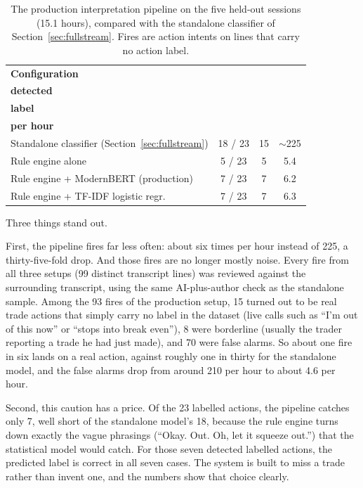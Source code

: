 \begin{table}[H]
\centering
\caption{The production interpretation pipeline on the five held-out sessions (15.1 hours), compared with the standalone classifier of Section~\ref{sec:fullstream}. Fires are action intents on lines that carry no action label.}
\label{tab:pipeline_fullstream}
\footnotesize
\setlength{\tabcolsep}{4pt}
\begin{tabular}{@{}lccc@{}}
\toprule
\textbf{Configuration} & \shortstack{\textbf{Labelled actions}\\\textbf{detected}} & \shortstack{\textbf{Exact}\\\textbf{label}} & \shortstack{\textbf{Fires}\\\textbf{per hour}} \\
\midrule
Standalone classifier (Section~\ref{sec:fullstream}) & 18 / 23 & 15 & $\sim$225 \\
Rule engine alone                                    &  5 / 23 &  5 & 5.4 \\
Rule engine + ModernBERT (production)                &  7 / 23 &  7 & 6.2 \\
Rule engine + TF-IDF logistic regr.                  &  7 / 23 &  7 & 6.3 \\
\bottomrule
\end{tabular}
\end{table}

Three things stand out.

First, the pipeline fires far less often: about six times per hour instead of 225, a thirty-five-fold drop. And those fires are no longer mostly noise. Every fire from all three setups (99 distinct transcript lines) was reviewed against the surrounding transcript, using the same AI-plus-author check as the standalone sample. Among the 93 fires of the production setup, 15 turned out to be real trade actions that simply carry no label in the dataset (live calls such as ``I'm out of this now'' or ``stops into break even''), 8 were borderline (usually the trader reporting a trade he had just made), and 70 were false alarms. So about one fire in six lands on a real action, against roughly one in thirty for the standalone model, and the false alarms drop from around 210 per hour to about 4.6 per hour.

Second, this caution has a price. Of the 23 labelled actions, the pipeline catches only 7, well short of the standalone model's 18, because the rule engine turns down exactly the vague phrasings (``Okay. Out. Oh, let it squeeze out.'') that the statistical model would catch. For those seven detected labelled actions, the predicted label is correct in all seven cases. The system is built to miss a trade rather than invent one, and the numbers show that choice clearly.

